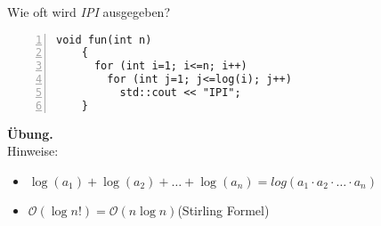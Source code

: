 \documentclass[aspectratio=169,handout]{beamer}
\begin{document}
\begin{frame}[fragile]
  Wie oft wird \emph{IPI} ausgegeben?
  \begin{lstlisting}[numbers=left]
    void fun(int n) 
    { 
      for (int i=1; i<=n; i++) 
        for (int j=1; j<=log(i); j++) 
          std::cout << "IPI"; 
    }
  \end{lstlisting}
  \pause
  \textbf{Übung.}\\[2ex]
  Hinweise:
  \begin{itemize}
  \item $\log(a_1) + \log(a_2) + \dotsc + \log(a_n) = log(a_1 \cdot a_2 \cdot \dotsc \cdot a_n)$
  \item $\mathcal{O}(\log n!) = \mathcal{O}(n \log n)$\hfill(Stirling Formel)
  \end{itemize}
\end{frame}
\end{document}
